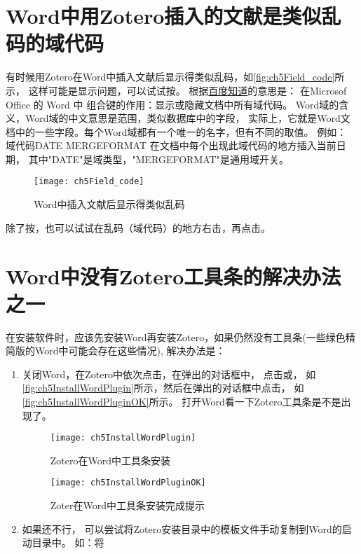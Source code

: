 \documentclass[theorem=false,mathfont=none,openany,sub3section]{easybook}
\begin{document}
{\section{Word中用Zotero插入的文献是类似乱码的域代码}\label{sec:field_code}
有时候用Zotero在Word中插入文献后显示得类似乱码，如\autoref{fig:ch5Field_code}所示，	
这样可能是显示问题，可以试试按。
根据\href{https://link.zhihu.com/?target=https\%3A//zhidao.baidu.com/question/158669989.html}
{百度知道}的意思是：
在Microsof Office 的 Word 中
组合键的作用：显示或隐藏文档中所有域代码。
Word域的含义，Word域的中文意思是范围，类似数据库中的字段，
实际上，它就是Word文档中的一些字段。每个Word域都有一个唯一的名字，但有不同的取值。
例如：
域代码{DATE\* MERGEFORMAT }在文档中每个出现此域代码的地方插入当前日期，
其中"DATE"是域类型，"\*MERGEFORMAT"是通用域开关。
\begin{figure}[htbp]
	\centering
	\texttt{[image: ch5Field\_code]}
	\caption{Word中插入文献后显示得类似乱码}
	\label{fig:ch5Field_code}
\end{figure}


除了按，也可以试试在乱码（域代码）的地方右击，再点击。

\section{Word中没有Zotero工具条的解决办法之一}\label{sec:tool_bar}
在安装软件时，应该先安装Word再安装Zotero，如果仍然没有工具条(一些绿色精简版的Word中可能会存在这些情况),	    	
解决办法是：
\begin{enumerate}
	\item 关闭Word，在Zotero中依次点击，在弹出的对话框中，
	点击或，
	如\autoref{fig:ch5InstallWordPlugin}所示，然后在弹出的对话框中点击，
	如\autoref{fig:ch5InstallWordPluginOK}所示。
	打开Word看一下Zotero工具条是不是出现了。
	
	\begin{figure}[htbp]
		\centering
		\texttt{[image: ch5InstallWordPlugin]}
		\caption{Zotero在Word中工具条安装}
		\label{fig:ch5InstallWordPlugin}
	\end{figure}
	
	\begin{figure}[htbp]
		\centering
		\texttt{[image: ch5InstallWordPluginOK]}
		\caption{Zoter在Word中工具条安装完成提示}
		\label{fig:ch5InstallWordPluginOK}
	\end{figure}
	\item 如果还不行，
	可以尝试将Zotero安装目录中的模板文件手动复制到Word的启动目录中。
	如：将
	

\end{enumerate}}
\end{document}
